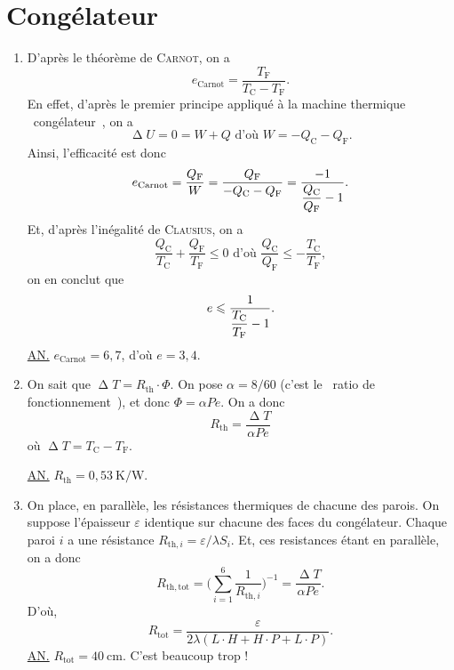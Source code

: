 \section{Congélateur}

\begin{enumerate}
	\item D'après le théorème de \textsc{Carnot}, on a \[
			e_\mathrm{Carnot} = \frac{T_\mathrm{F}}{T_\mathrm{C} - T_\mathrm{F}}
		.\]
		En effet, d'après le premier principe appliqué à la machine thermique \guillemotleft~congélateur~\guillemotright, on a \[
			\upDelta U = 0 = W + Q \text{ d'où } W = - Q_\mathrm{C} - Q_\mathrm{F}
		.\]
		Ainsi, l'efficacité est donc \[
			e_\mathrm{Carnot} = \frac{Q_\mathrm{F}}{W} = \frac{Q_\mathrm{F}}{-Q_\mathrm{C} - Q_\mathrm{F}} = \frac{-1}{\displaystyle\frac{Q_\mathrm{C}}{Q_\mathrm{F}} - 1}
		.\]
		Et, d'après l'inégalité de \textsc{Clausius}, on a \[
			\frac{Q_\mathrm{C}}{T_\mathrm{C}} + \frac{Q_\mathrm{F}}{T_\mathrm{F}} \le 0 \text{ d'où } \frac{Q_\mathrm{C}}{Q_\mathrm{F}} \le -\frac{T_\mathrm{C}}{T_\mathrm{F}}
		,\] on en conclut que \[
			e \leqslant \frac{1}{\displaystyle\frac{T_\mathrm{C}}{T_\mathrm{F}} - 1}
		.\]
		\underline{AN.} $e_\mathrm{Carnot}  = 6{,}7$, d'où $e = 3{,}4$.
	\item On sait que $\upDelta T = R_\mathrm{th} \cdot \Phi$.
		On pose $\alpha = 8 / 60$ (c'est le \guillemotleft~ratio de fonctionnement~\guillemotright), et donc $\Phi = \alpha P e$.
		On a donc \[
			R_\mathrm{th} = \frac{\upDelta T}{\alpha P e}
		\] où $\upDelta T = T_\mathrm{C} - T_\mathrm{F}$.

		\underline{AN.} $R_\mathrm{th} = 0{,}53\:\mathrm{K / W}$.
	\item On place, en parallèle, les résistances thermiques de chacune des parois. On suppose l'épaisseur $\varepsilon$ identique sur chacune des faces du congélateur.
		Chaque paroi $i$ a une résistance $R_{\mathrm{th}, i} = \varepsilon / \lambda S_i$.
		Et, ces resistances étant en parallèle, on a donc \[
			R_\mathrm{th,tot} = \Big(\sum_{i=1}^6 \frac{1}{R_{\mathrm{th},i}}\Big)^{-1} = \frac{\upDelta T}{\alpha P e}
		.\] D'où, \[
			R_\mathrm{tot}  = \frac{\varepsilon}{2 \lambda (L\cdot H + H\cdot P + L\cdot P)}
		.\]
		\underline{AN.} $R_\mathrm{tot} = 40\:\mathrm{cm}$. C'est beaucoup trop !
\end{enumerate}

